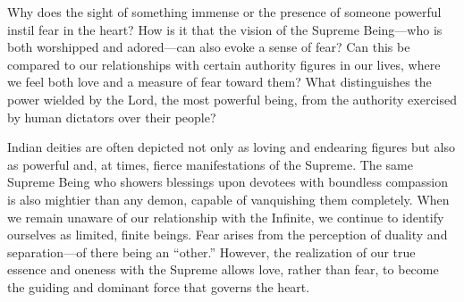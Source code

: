\newpage
\begin{mananam}{}
\normalfont\mananamtext Why does the sight of something immense or the presence of someone powerful instil fear in the heart? How is it that the vision of the Supreme Being—who is both worshipped and adored—can also evoke a sense of fear? Can this be compared to our relationships with certain authority figures in our lives, where we feel both love and a measure of fear toward them? What distinguishes the power wielded by the Lord, the most powerful being, from the authority exercised by human dictators over their people? 
\end{mananam}
\sreflect
\begin{inspiration}{}
\normalfont\mananamtext Indian deities are often depicted not only as loving and endearing figures but also as powerful and, at times, fierce manifestations of the Supreme. The same Supreme Being who showers blessings upon devotees with boundless compassion is also mightier than any demon, capable of vanquishing them completely.
When we remain unaware of our relationship with the Infinite, we continue to identify ourselves as limited, finite beings. Fear arises from the perception of duality and separation—of there being an “other.” However, the realization of our true essence and oneness with the Supreme allows love, rather than fear, to become the guiding and dominant force that governs the heart.
\end{inspiration}
\newpage

